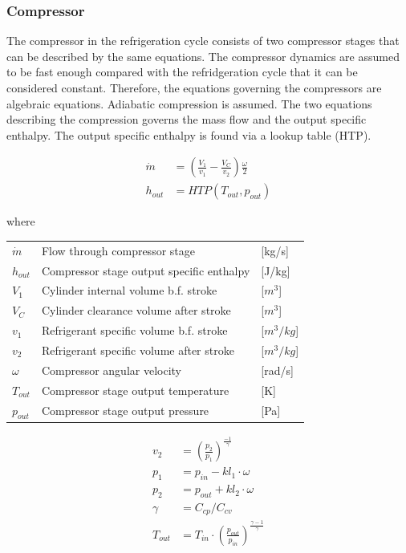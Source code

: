 \subsubsection{Compressor}
The compressor in the refrigeration cycle consists of two compressor stages that can be described by the same equations.
The compressor dynamics are assumed to be fast enough compared with the refridgeration cycle that it can be considered constant. Therefore, the equations governing the compressors are algebraic equations. 
Adiabatic compression is assumed. 
The two equations describing the compression governs the mass flow and the output specific enthalpy. The output specific enthalpy is found via a lookup table (HTP). 

\begin{align}
	\dot{m} &= \left(\frac{V_1}{v_1} - \frac{V_C}{v_2}\right) \frac{\omega}{2} \\
	h_{out} &= HTP(T_{out}, p_{out}) 
\end{align}

where

\begin{center}
	\begin{tabular}{l p{8cm} l}
		$\dot{m}$				& Flow through compressor stage					& [\si{kg}/\si{s}]\\ 
		$h_{out}$				& Compressor stage output specific enthalpy				& [\si{J}/\si{kg}]\\ 
		$V_1$					& Cylinder internal volume b.f. stroke			& [$\si{m}^3$]\\ 
		$V_C$					& Cylinder clearance volume after stroke		& [$\si{m}^3$]\\ 
		$v_1$					& Refrigerant specific volume b.f. stroke		& [$\si{m}^3/\si{kg}$]\\
		$v_2$					& Refrigerant specific volume after stroke		& [$\si{m}^3/\si{kg}$]\\
		$\omega$ 				& Compressor angular velocity 					& [\si{rad}/\si{s}]\\
		$T_{out}$ 				& Compressor stage output temperature 			& [\si{K}]\\
		$p_{out}$				& Compressor stage output pressure 				& [\si{Pa}]\\
	\end{tabular}
\end{center}

\begin{align}
	v_2 &= \left(\frac{p_2}{p_1}\right)^{\frac{-1}{\gamma}} \\
	p_1 &= p_{in} - kl_1 \cdot \omega \\
	p_2 &= p_{out} + kl_2 \cdot \omega \\
	\gamma &= C_{cp}/C_{cv} \\
	T_{out} &= T_{in}\cdot \left(\frac{p_{out}}{p_{in}}\right)^{\frac{\gamma-1}{\gamma}}
\end{align}

